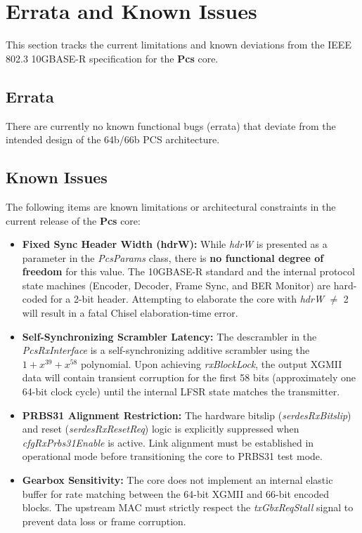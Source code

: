 \section{Errata and Known Issues}

This section tracks the current limitations and known deviations from the IEEE 802.3 10GBASE-R specification for the \textbf{Pcs} core.

\subsection{Errata}
There are currently no known functional bugs (errata) that deviate from the intended design of the 64b/66b PCS architecture.

\subsection{Known Issues}

The following items are known limitations or architectural constraints in the current release of the \textbf{Pcs} core:

\begin{itemize}[noitemsep]
    \item \textbf{Fixed Sync Header Width (hdrW):} 
    While \textit{hdrW} is presented as a parameter in the \textit{PcsParams} class, there is \textbf{no functional degree of freedom} for this value. The 10GBASE-R standard and the internal protocol state machines (Encoder, Decoder, Frame Sync, and BER Monitor) are hard-coded for a 2-bit header. Attempting to elaborate the core with \textit{hdrW} $\neq$ 2 will result in a fatal Chisel elaboration-time error.
    
    \item \textbf{Self-Synchronizing Scrambler Latency:} 
    The descrambler in the \textit{PcsRxInterface} is a self-synchronizing additive scrambler using the $1 + x^{39} + x^{58}$ polynomial. Upon achieving \textit{rxBlockLock}, the output XGMII data will contain transient corruption for the first 58 bits (approximately one 64-bit clock cycle) until the internal LFSR state matches the transmitter.
    
    \item \textbf{PRBS31 Alignment Restriction:} 
    The hardware bitslip (\textit{serdesRxBitslip}) and reset (\textit{serdesRxResetReq}) logic is explicitly suppressed when \textit{cfgRxPrbs31Enable} is active. Link alignment must be established in operational mode before transitioning the core to PRBS31 test mode.
    
    \item \textbf{Gearbox Sensitivity:} 
    The core does not implement an internal elastic buffer for rate matching between the 64-bit XGMII and 66-bit encoded blocks. The upstream MAC must strictly respect the \textit{txGbxReqStall} signal to prevent data loss or frame corruption.
\end{itemize}